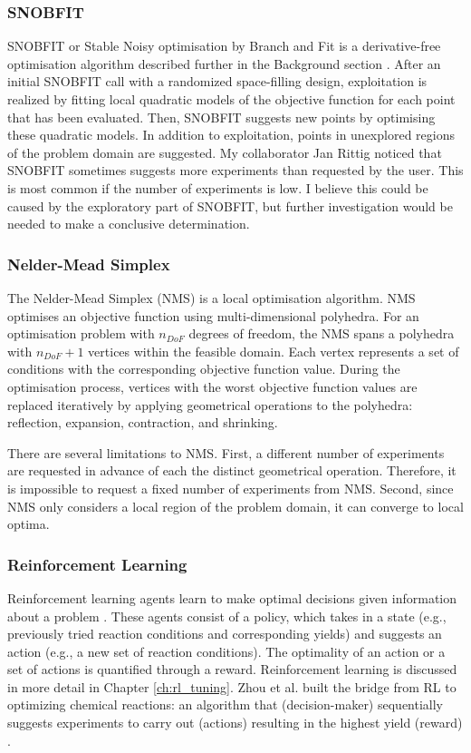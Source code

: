\subsubsection{SNOBFIT}
SNOBFIT or Stable Noisy optimisation by Branch and Fit is a derivative-free optimisation algorithm described further in the Background section \cite{Huyer2008}.  After an initial SNOBFIT call with a randomized space-filling design, exploitation is realized by fitting local quadratic  models of the objective function for each point that has been evaluated. Then, SNOBFIT suggests new points by optimising these quadratic models. In addition to exploitation, points in unexplored regions of the problem domain are suggested. My collaborator Jan Rittig noticed that SNOBFIT sometimes suggests more experiments than requested by the user. This is most common if the number of experiments is low. I believe this could be caused by the exploratory part of SNOBFIT, but further investigation would be needed to make a conclusive determination.

 \subsubsection{Nelder-Mead Simplex}
The Nelder-Mead Simplex (NMS)\cite{Nelder1965} is a local optimisation algorithm.  NMS optimises an objective function using multi-dimensional polyhedra. For an optimisation problem with $n_{DoF}$ degrees of freedom, the NMS spans a polyhedra with $n_{DoF} + 1$ vertices within the feasible domain. Each vertex represents a set of conditions with the corresponding objective function value.  During the optimisation process, vertices with the worst objective function values are replaced iteratively by applying geometrical operations to the polyhedra: reflection, expansion, contraction, and shrinking. 

There are several limitations to NMS. First, a different number of experiments are requested in advance of each the distinct geometrical operation. Therefore, it is impossible to request a fixed number of experiments from NMS.  Second, since NMS only considers a local region of the problem domain, it can converge to local optima. 
\subsubsection{Reinforcement Learning}
Reinforcement learning agents learn to make optimal decisions given information about a problem \cite{sutton2018reinforcement}. These agents consist of a policy, which takes in a state (e.g., previously tried reaction conditions and corresponding yields) and suggests an action (e.g., a new set of reaction conditions). The optimality of an action or a set of actions is quantified through a reward. Reinforcement learning is discussed in more detail in Chapter \ref{ch:rl_tuning}. Zhou et al. built the bridge from RL to optimizing chemical reactions: an algorithm that (decision-maker) sequentially suggests experiments to carry out (actions) resulting in the highest yield (reward) \cite{Zhou2017}.

